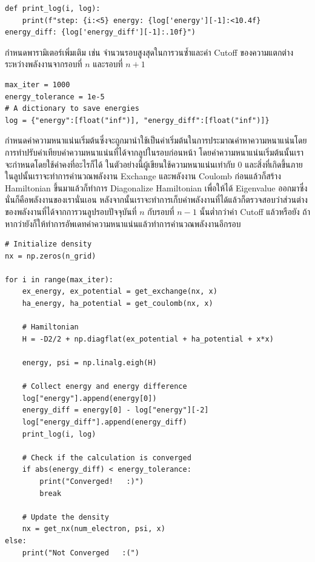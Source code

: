 \begin{lstlisting}[style=MyPython]
def print_log(i, log):
    print(f"step: {i:<5} energy: {log['energy'][-1]:<10.4f} energy_diff: {log['energy_diff'][-1]:.10f}")
\end{lstlisting}
%
\vspace{5pt}
%
กำหนดพารามิเตอร์เพิ่มเติม เช่น จำนวนรอบสูงสุดในการวนซ้ำและค่า Cutoff ของความแตกต่างระหว่างพลังงานจากรอบที่ $n$ และรอบที่ $n+1$

\begin{lstlisting}[style=MyPython]
max_iter = 1000
energy_tolerance = 1e-5
# A dictionary to save energies
log = {"energy":[float("inf")], "energy_diff":[float("inf")]}
\end{lstlisting}
%
\vspace{5pt}
%
กำหนดค่าความหนาแน่นเริ่มต้นซึ่งจะถูกมานำใช้เป็นค่าเริ่มต้นในการประมาณค่าหาความหนาแน่นโดยการทำปรับค่าเทียบค่าความหนาแน่นที่ได้จากลูปในรอบก่อนหน้า โดยค่าความหนาแน่นเริ่มต้นนั้นเราจะกำหนดโดยใช้ค่าคงที่อะไรก็ได้ ในตัวอย่างนี้ผู้เขียนใช้ความหนาแน่นเท่ากับ 0 และสิ่งที่เกิดขึ้นภายในลูปนั้นเราจะทำการคำนวณพลังงาน Exchange และพลังงาน Coulomb ก่อนแล้วก็สร้าง Hamiltonian ขึ้นมาแล้วก็ทำการ Diagonalize
Hamiltonian เพื่อให้ได้ Eigenvalue ออกมาซึ่งนั่นก็คือพลังงานของเรานั่นเอน หลังจากนั้นเราจะทำการเก็บค่าพลังงานที่ได้แล้วก็ตรวจสอบว่าส่วนต่างของพลังงานที่ได้จากการวนลูปรอบปัจจุบันที่ $n$ กับรอบที่ $n-1$ นั้นต่ำกว่าค่า Cutoff แล้วหรือยัง ถ้าหากว่ายังก็ให้ทำการอัพเดทค่าความหนาแน่นแล้วทำการคำนวณพลังงานอีกรอบ

\vspace{5pt}

\begin{lstlisting}[style=MyPython]
# Initialize density
nx = np.zeros(n_grid)

for i in range(max_iter):
    ex_energy, ex_potential = get_exchange(nx, x)
    ha_energy, ha_potential = get_coulomb(nx, x)
    
    # Hamiltonian
    H = -D2/2 + np.diagflat(ex_potential + ha_potential + x*x)
    
    energy, psi = np.linalg.eigh(H)
    
    # Collect energy and energy difference
    log["energy"].append(energy[0])
    energy_diff = energy[0] - log["energy"][-2]
    log["energy_diff"].append(energy_diff)
    print_log(i, log)
    
    # Check if the calculation is converged
    if abs(energy_diff) < energy_tolerance:
        print("Converged!   :)")
        break
    
    # Update the density
    nx = get_nx(num_electron, psi, x)
else:
    print("Not Converged   :(")
\end{lstlisting}

